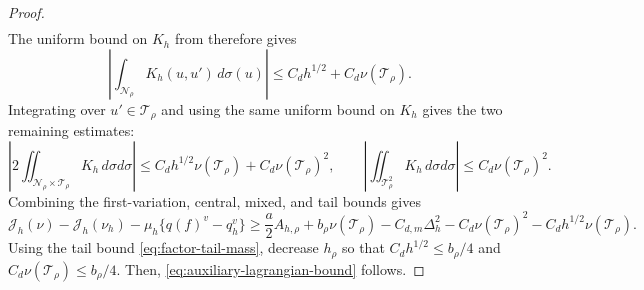 \begin{proof}
\begin{equation*}
\begin{aligned}
\end{aligned}
\end{equation*}
The uniform bound on $K_h$ from
 therefore gives
\[
  \left|\int_{\mathcal N_\rho}K_h(u,u')\,d\sigma(u)\right|
  \le C_dh^{1/2}+C_d\nu(\mathcal T_\rho).
\]
Integrating over $u'\in\mathcal T_\rho$ and using the same uniform bound on
$K_h$ gives the two remaining estimates:
\[
  \left|2\iint_{\mathcal N_\rho\times\mathcal T_\rho} K_h\,d\sigma d\sigma\right|
  \le C_dh^{1/2}\nu(\mathcal T_\rho)+C_d\nu(\mathcal T_\rho)^2,
  \qquad
  \left|\iint_{\mathcal T_\rho^2}K_h\,d\sigma d\sigma\right|
  \le C_d\nu(\mathcal T_\rho)^2.
\]
Combining the first-variation, central, mixed, and tail bounds gives
\begin{equation*}
  \mathcal J_h(\nu)-\mathcal J_h(\nu_h)
    -\mu_h\{q(f)^v-q_h^v\}
  \ge\frac{a}{2}A_{h,\rho}+b_\rho\nu(\mathcal T_\rho)
  -C_{d,m}\Delta_h^2-C_d\nu(\mathcal T_\rho)^2
    -C_dh^{1/2}\nu(\mathcal T_\rho).
\end{equation*}
Using the tail bound \eqref{eq:factor-tail-mass}, decrease $h_\rho$ so that
$C_dh^{1/2}\le b_\rho/4$ and $C_d\nu(\mathcal T_\rho)\le b_\rho/4$.
Then, \eqref{eq:auxiliary-lagrangian-bound} follows.
\end{proof}
